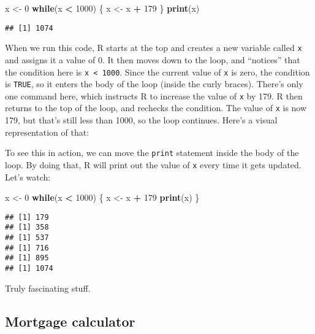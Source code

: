 \documentclass[]{book}
\newenvironment{Shaded}{\begin{snugshade}}{\end{snugshade}}
\newcommand{\ControlFlowTok}[1]{\textcolor[rgb]{0.13,0.29,0.53}{\textbf{#1}}}
\newcommand{\DecValTok}[1]{\textcolor[rgb]{0.00,0.00,0.81}{#1}}
\newcommand{\KeywordTok}[1]{\textcolor[rgb]{0.13,0.29,0.53}{\textbf{#1}}}
\newcommand{\NormalTok}[1]{#1}
\newcommand{\OperatorTok}[1]{\textcolor[rgb]{0.81,0.36,0.00}{\textbf{#1}}}
\newcommand{\StringTok}[1]{\textcolor[rgb]{0.31,0.60,0.02}{#1}}
\begin{document}
\begin{Shaded}
\begin{Highlighting}[]
\NormalTok{x <-}\StringTok{ }\DecValTok{0}
\ControlFlowTok{while}\NormalTok{(x }\OperatorTok{<}\StringTok{ }\DecValTok{1000}\NormalTok{) \{}
\NormalTok{  x <-}\StringTok{ }\NormalTok{x }\OperatorTok{+}\StringTok{ }\DecValTok{179}
\NormalTok{\}}
\KeywordTok{print}\NormalTok{(x)}
\end{Highlighting}
\end{Shaded}

\begin{verbatim}
## [1] 1074
\end{verbatim}

When we run this code, R starts at the top and creates a new variable called \texttt{x} and assigns it a value of 0. It then moves down to the loop, and ``notices'' that the condition here is \texttt{x\ \textless{}\ 1000}. Since the current value of \texttt{x} is zero, the condition is \texttt{TRUE}, so it enters the body of the loop (inside the curly braces). There's only one command here, which instructs R to increase the value of \texttt{x} by 179. R then returns to the top of the loop, and rechecks the condition. The value of \texttt{x} is now 179, but that's still less than 1000, so the loop continues. Here's a visual representation of that:

To see this in action, we can move the \texttt{print} statement inside the body of the loop. By doing that, R will print out the value of \texttt{x} every time it gets updated. Let's watch:

\begin{Shaded}
\begin{Highlighting}[]
\NormalTok{x <-}\StringTok{ }\DecValTok{0}
\ControlFlowTok{while}\NormalTok{(x }\OperatorTok{<}\StringTok{ }\DecValTok{1000}\NormalTok{) \{}
\NormalTok{  x <-}\StringTok{ }\NormalTok{x }\OperatorTok{+}\StringTok{ }\DecValTok{179}
  \KeywordTok{print}\NormalTok{(x)}
\NormalTok{\}}
\end{Highlighting}
\end{Shaded}

\begin{verbatim}
## [1] 179
## [1] 358
## [1] 537
## [1] 716
## [1] 895
## [1] 1074
\end{verbatim}

Truly fascinating stuff.

\hypertarget{mortgage-calculator}{%
\subsection{Mortgage calculator}\label{mortgage-calculator}}
\end{document}
